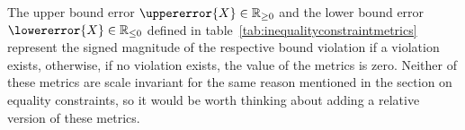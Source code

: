 The upper bound error $\uppererror{X} \in \mathbb{R}_{\ge 0}$ and
the lower bound error $\lowererror{X} \in \mathbb{R}_{\le 0}$ defined
in table~\ref{tab:inequalityconstraintmetrics} represent the signed
magnitude of the respective bound violation if a violation exists, otherwise,
if no violation exists, the value of the metrics is zero.
Neither of these metrics are scale invariant for the same reason mentioned in the
section on equality constraints, so it would be worth thinking about adding
a relative version of these metrics.